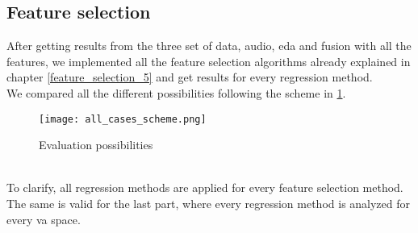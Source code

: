\subsection{Feature selection}
After getting results from the three set of data, audio, \gls{eda} and fusion with all the features, we implemented all the feature selection algorithms already explained in chapter \ref{feature_selection_5} and get results for every regression method.
\\ \indent
We compared all the different possibilities following the scheme in \ref{fig:all_cases_scheme}.
\begin{figure}[h]
    \centering
    \texttt{[image: all\_cases\_scheme.png]} 
	\caption{Evaluation possibilities}
    \label{fig:all_cases_scheme}
\end{figure}
\\
To clarify, all regression methods are applied for every feature selection method. The same is valid for the last part, where every regression method is analyzed for every \gls{va} space.
\newpage
